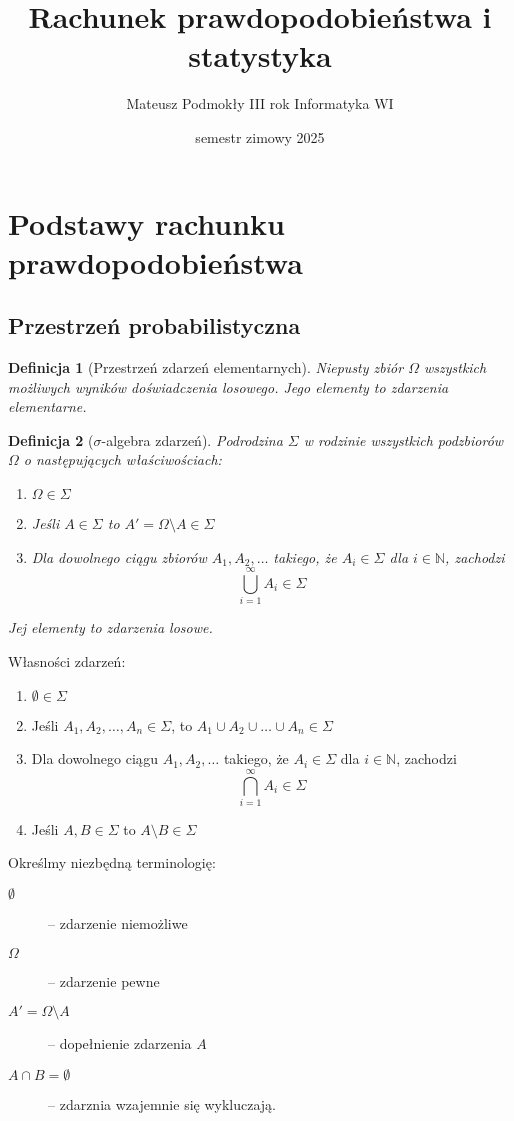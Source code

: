 \documentclass[11pt, leqno]{scrartcl}
\title{Rachunek prawdopodobieństwa i statystyka}
\author{Mateusz Podmokły III rok Informatyka WI}
\date{semestr zimowy 2025}
\theoremstyle{mydefinition}
\newtheorem{definition}{Definicja}[subsection]
\theoremstyle{mytheorem}
\begin{document}
    \maketitle
    \section{Podstawy rachunku prawdopodobieństwa}
    \subsection{Przestrzeń probabilistyczna}
    \begin{definition}[Przestrzeń zdarzeń elementarnych]
        Niepusty zbiór $\Omega$ wszystkich możliwych wyników
        doświadczenia losowego. Jego elementy to zdarzenia elementarne.
    \end{definition}
    \begin{definition}[$\sigma$-algebra zdarzeń]
        Podrodzina $\Sigma$ w rodzinie wszystkich podzbiorów $\Omega$
        o następujących właściwościach:
        \begin{enumerate}
            \item $\Omega \in \Sigma$
            \item Jeśli $A \in \Sigma$ to $A'=\Omega \setminus A \in
                \Sigma$
            \item Dla dowolnego ciągu zbiorów $A_1,A_2,\ldots$ takiego,
                że $A_i \in \Sigma$ dla $i \in \mathbb{N}$, zachodzi
                \[
                    \bigcup_{i=1}^{\infty}A_i \in \Sigma
                \]
        \end{enumerate}
        Jej elementy to zdarzenia losowe.
    \end{definition}
    \noindent
    Własności zdarzeń:
    \begin{enumerate}
        \item $\emptyset \in \Sigma$
        \item Jeśli $A_1,A_2,\ldots,A_n \in \Sigma$, to
            $A_1 \cup A_2 \cup \ldots \cup A_n \in \Sigma$
        \item Dla dowolnego ciągu $A_1,A_2,\ldots$ takiego, że
            $A_i \in \Sigma$ dla $i \in \mathbb{N}$, zachodzi
            \[
                \bigcap_{i=1}^{\infty}A_i \in \Sigma
            \]
        \item Jeśli $A,B \in \Sigma$ to $A \setminus B \in \Sigma$
    \end{enumerate}
    Określmy niezbędną terminologię:
    \begin{description}
        \item[$\emptyset$] -- zdarzenie niemożliwe
        \item[$\Omega$] -- zdarzenie pewne
        \item[$A'=\Omega \setminus A$] -- dopełnienie zdarzenia $A$
        \item[$A \cap B= \emptyset$] -- zdarznia wzajemnie się
            wykluczają.
    \end{description}
\end{document}
